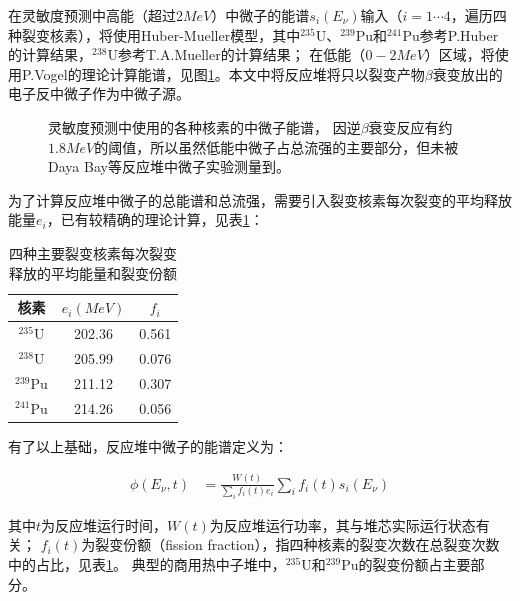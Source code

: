 在灵敏度预测中高能（超过2$\si{MeV}$）中微子的能谱$s_i(E_\nu)$输入（$i=1\cdots4$，遍历四种裂变核素），将使用Huber-Mueller模型，其中${}^{235}\mathrm{U}$、${}^{239}\mathrm{Pu}$和${}^{241}\mathrm{Pu}$参考P.Huber的计算结果\cite{huber_determination_2011}，${}^{238}\mathrm{U}$参考T.A.Mueller的计算结果\cite{mueller_improved_2011}；
在低能（$0-2\si{MeV}$）区域，将使用P.Vogel的理论计算能谱\cite{p_vogel_neutrino_1989}，见图\ref{fig:neutrino_energy_spectrum}。本文中将反应堆将只以裂变产物$\beta$衰变放出的电子反中微子作为中微子源。

\begin{figure}
    \centering
    
    \caption{\label{fig:neutrino_energy_spectrum} 灵敏度预测中使用的各种核素的中微子能谱，
    因逆$\beta$衰变反应有约$1.8\si{MeV}$的阈值，所以虽然低能中微子占总流强的主要部分，但未被Daya Bay等反应堆中微子实验测量到\cite{an_improved_2017}。}
\end{figure}

为了计算反应堆中微子的总能谱和总流强，需要引入裂变核素每次裂变的平均释放能量$e_i$，已有较精确的理论计算\cite{ma_improved_2013}，见表\ref{tab:per_fission}：

\begin{table}
  \centering
  \caption{四种主要裂变核素每次裂变释放的平均能量和裂变份额}
  \begin{tabular}{ccc}
    \toprule
    核素 & $e_i(\si{MeV})$ & $f_i$ \\
    \midrule
    ${}^{235}\mathrm{U}$ & 202.36 & 0.561 \\
    ${}^{238}\mathrm{U}$ & 205.99 & 0.076 \\
    ${}^{239}\mathrm{Pu}$ & 211.12 & 0.307 \\
    ${}^{241}\mathrm{Pu}$ & 214.26 & 0.056 \\
    \bottomrule
  \end{tabular}
  \label{tab:per_fission}
\end{table}

有了以上基础，反应堆中微子的能谱定义为：

\begin{align}
    \label{eq:sum_spectrum}
    \phi\left(E_\nu,t\right) &= \frac{W(t)}{\sum_i f_i(t)e_i}\sum_i f_i(t)s_i(E_\nu)
\end{align}

其中$t$为反应堆运行时间，$W(t)$为反应堆运行功率，其与堆芯实际运行状态有关\cite{juno_collaboration_tao_2020}；
$f_i(t)$为裂变份额（fission fraction），指四种核素的裂变次数在总裂变次数中的占比，见表\ref{tab:per_fission}。
典型的商用热中子堆中，${}^{235}\mathrm{U}$和${}^{239}\mathrm{Pu}$的裂变份额占主要部分。


